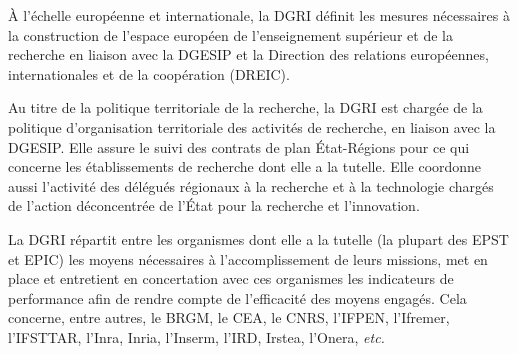 \`A l'\'echelle europ\'eenne et internationale, la DGRI d\'efinit les mesures n\'ecessaires \`a la construction de l'espace europ\'een de l'enseignement sup\'erieur et de la recherche en liaison avec la DGESIP et la Direction des relations europ\'eennes, internationales et de la coop\'eration (DREIC).

Au titre de la politique territoriale de la recherche, la DGRI est charg\'ee de la politique d'organisation territoriale des activit\'es de recherche, en liaison avec la DGESIP. Elle assure le suivi des contrats de plan \'Etat-R\'egions pour ce qui concerne les \'etablissements de recherche dont elle a la tutelle.
Elle coordonne aussi l'activit\'e des d\'el\'egu\'es r\'egionaux \`a la recherche et \`a la technologie charg\'es de l'action d\'econcentr\'ee de l'\'Etat pour la recherche et l'innovation.

La DGRI r\'epartit entre les organismes dont elle a la tutelle (la
plupart des EPST et EPIC) les moyens n\'ecessaires \`a
l'accomplissement de leurs missions, met en place et entretient en
concertation avec ces organismes les indicateurs de performance afin
de rendre compte de l'efficacit\'e des moyens engag\'es. Cela
concerne, entre autres, le BRGM, le CEA, le CNRS,
l'IFPEN, l'Ifremer, l'IFSTTAR, l'Inra, Inria, l'Inserm, l'IRD, Irstea,
l'Onera, {\em etc.}



